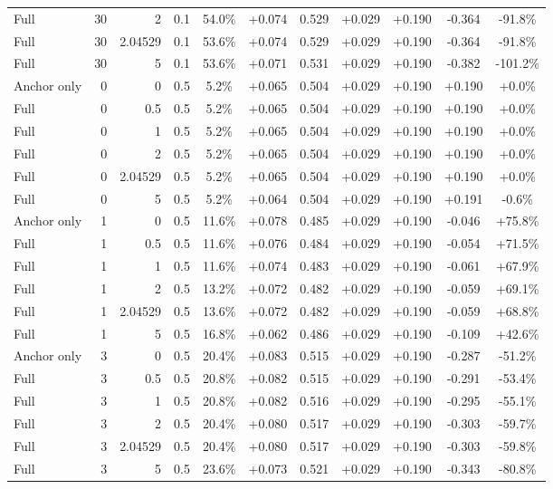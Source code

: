 \begin{table}[htbp]
\begin{tabular}{lrrrccccccc}
Full & 30 & 2 & 0.1 & 54.0\% & +0.074 & 0.529 & +0.029 & +0.190 & -0.364 & -91.8\% \\
Full & 30 & 2.04529 & 0.1 & 53.6\% & +0.074 & 0.529 & +0.029 & +0.190 & -0.364 & -91.8\% \\
Full & 30 & 5 & 0.1 & 53.6\% & +0.071 & 0.531 & +0.029 & +0.190 & -0.382 & -101.2\% \\
Anchor only & 0 & 0 & 0.5 & 5.2\% & +0.065 & 0.504 & +0.029 & +0.190 & +0.190 & +0.0\% \\
Full & 0 & 0.5 & 0.5 & 5.2\% & +0.065 & 0.504 & +0.029 & +0.190 & +0.190 & +0.0\% \\
Full & 0 & 1 & 0.5 & 5.2\% & +0.065 & 0.504 & +0.029 & +0.190 & +0.190 & +0.0\% \\
Full & 0 & 2 & 0.5 & 5.2\% & +0.065 & 0.504 & +0.029 & +0.190 & +0.190 & +0.0\% \\
Full & 0 & 2.04529 & 0.5 & 5.2\% & +0.065 & 0.504 & +0.029 & +0.190 & +0.190 & +0.0\% \\
Full & 0 & 5 & 0.5 & 5.2\% & +0.064 & 0.504 & +0.029 & +0.190 & +0.191 & -0.6\% \\
Anchor only & 1 & 0 & 0.5 & 11.6\% & +0.078 & 0.485 & +0.029 & +0.190 & -0.046 & +75.8\% \\
Full & 1 & 0.5 & 0.5 & 11.6\% & +0.076 & 0.484 & +0.029 & +0.190 & -0.054 & +71.5\% \\
Full & 1 & 1 & 0.5 & 11.6\% & +0.074 & 0.483 & +0.029 & +0.190 & -0.061 & +67.9\% \\
Full & 1 & 2 & 0.5 & 13.2\% & +0.072 & 0.482 & +0.029 & +0.190 & -0.059 & +69.1\% \\
Full & 1 & 2.04529 & 0.5 & 13.6\% & +0.072 & 0.482 & +0.029 & +0.190 & -0.059 & +68.8\% \\
Full & 1 & 5 & 0.5 & 16.8\% & +0.062 & 0.486 & +0.029 & +0.190 & -0.109 & +42.6\% \\
Anchor only & 3 & 0 & 0.5 & 20.4\% & +0.083 & 0.515 & +0.029 & +0.190 & -0.287 & -51.2\% \\
Full & 3 & 0.5 & 0.5 & 20.8\% & +0.082 & 0.515 & +0.029 & +0.190 & -0.291 & -53.4\% \\
Full & 3 & 1 & 0.5 & 20.8\% & +0.082 & 0.516 & +0.029 & +0.190 & -0.295 & -55.1\% \\
Full & 3 & 2 & 0.5 & 20.4\% & +0.080 & 0.517 & +0.029 & +0.190 & -0.303 & -59.7\% \\
Full & 3 & 2.04529 & 0.5 & 20.4\% & +0.080 & 0.517 & +0.029 & +0.190 & -0.303 & -59.8\% \\
Full & 3 & 5 & 0.5 & 23.6\% & +0.073 & 0.521 & +0.029 & +0.190 & -0.343 & -80.8\% \\

\end{tabular}
\end{table}

